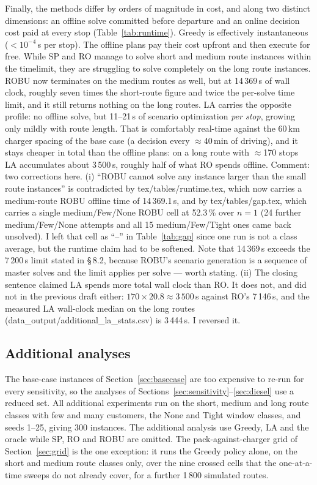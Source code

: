 \documentclass[preprint,12pt,3p]{elsarticle}
\newcommand{\green}[1]{{\color{darkgreen}#1}}
\newcommand{\blue}[1]{{\color{darkblue}#1}}
\begin{document}
Finally, the methods differ by orders of magnitude in cost, and along two distinct dimensions: an offline solve committed before departure and an online decision cost paid at every stop (Table~\ref{tab:runtime}). Greedy is effectively instantaneous ($<10^{-4}$\,s per stop). The offline plans pay their cost upfront and then execute for free. While SP and RO manage to solve short and medium route instances within the timelimit, they are struggling to solve completely on the long route instances. \blue{ROBU now terminates on the medium routes as well, but at 14\,369\,s of wall clock, roughly seven times the short-route figure and twice the per-solve time limit, and it still returns nothing on the long routes.}
LA carries the opposite profile: no offline solve, but \blue{11--21}\,s of scenario optimization \emph{per stop}, growing only mildly with route length. That is comfortably real-time against the 60\,km charger spacing of the base case (a decision every $\approx$40\,min of driving), \blue{and it stays cheaper in total than the offline plans: on a long route with $\approx$170 stops LA accumulates about 3\,500\,s, roughly half of what RO spends offline.}
\green{Comment: two corrections here. (i) ``ROBU cannot solve any instance larger than
the small route instances'' is contradicted by tex/tables/runtime.tex, which now
carries a medium-route ROBU offline time of 14\,369.1\,s, and by
tex/tables/gap.tex, which carries a single medium/Few/None ROBU cell at 52.3\,\%
over $n=1$ (24 further medium/Few/None attempts and all 15 medium/Few/Tight ones
came back unsolved). I left that cell as ``--'' in Table~\ref{tab:gap} since one run
is not a class average, but the runtime claim had to be softened. Note that 14\,369\,s
exceeds the 7\,200\,s limit stated in \S\,8.2, because ROBU's scenario generation is a
sequence of master solves and the limit applies per solve --- worth stating.
(ii) The closing sentence claimed LA spends more total wall clock than RO. It does
not, and did not in the previous draft either: $170 \times 20.8 \approx 3\,500$\,s against
RO's 7\,146\,s, and the measured LA wall-clock median on the long routes
(data\_output/additional\_la\_stats.csv) is 3\,444\,s. I reversed it.}


\subsection{Additional analyses}
\label{sec:additional-protocol}

The base-case instances of Section~\ref{sec:basecase} are too expensive to re-run for every sensitivity, so the analyses of Sections~\ref{sec:sensitivity}--\ref{sec:diesel} use a reduced set. All additional experiments run on the short, medium and long route classes with few and many customers, the None and Tight window classes, and seeds 1--25, giving 300 instances.
The additional analysis use Greedy, LA and the oracle while SP, RO and ROBU are omitted.
\blue{The pack-against-charger grid of Section~\ref{sec:grid} is the one exception: it
runs the Greedy policy alone, on the short and medium route classes only, over the
nine crossed cells that the one-at-a-time sweeps do not already cover, for a
further 1\,800 simulated routes.}
\end{document}
